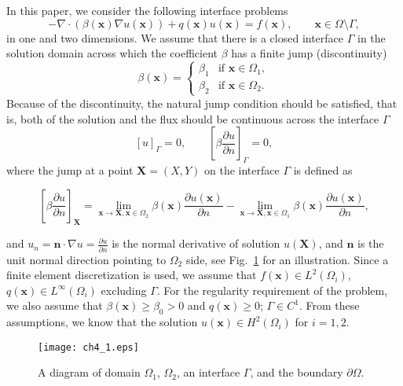 \documentclass[11pt]{article}
\numberwithin{equation}{section}
\begin{document}
In this paper, we consider  the following  interface problems
\begin{equation} \label{nabla-pde ch2}
 -  \nabla \cdot (\beta(\mathbf{x})  \nabla u(\mathbf{x})) + q(\mathbf{x}) u(\mathbf{x}) = f(\mathbf{x}), \qquad \mathbf{x}\in \Omega\setminus \Gamma,
\end{equation}
in one and two dimensions.
We assume that there is a closed interface $\Gamma$ in the solution domain across
which the coefficient $\beta$ has a finite jump (discontinuity)
\begin{equation}\label{beta ch2}
\beta(\mathbf{x})  =
\begin{cases}
 \beta_1  & \mbox{if $\mathbf{x} \in \Omega_1,$}\\
 \beta_2  & \mbox{if $\mathbf{x} \in \Omega_2.$}
 \end{cases}
\end{equation}
Because of the discontinuity,
the natural jump condition should be satisfied,
that is, both of the solution and the flux should be continuous across the interface $\Gamma$
\begin{equation}\label{flux ch2}
 [u]_{\Gamma}=0, \qquad \left[\beta \frac{\partial u}{\partial n} \right]_{\Gamma} = 0,
\end{equation}
where the jump at a point $\mathbf{X}=(X,Y)$ on the interface $\Gamma$ is defined as
\begin{small}
\begin{equation*}
\left[\beta \frac{\partial u}{\partial n} \right]_{\mathbf{X}}
  = \lim_{\mathbf{x} \rightarrow\mathbf{X}, \mathbf{x} \in \Omega_2} \beta(\mathbf{x}) \frac{\partial u(\mathbf{x})}{\partial n}  - \lim_{\mathbf{x}\rightarrow \mathbf{X}, \mathbf{x}\in \Omega_1} \beta(\mathbf{x}) \frac{\partial u(\mathbf{x})}{\partial n},
\end{equation*}
\end{small}
and  $u_n = \mathbf{n} \cdot \nabla u=\frac{\partial u}{\partial n}$ is the normal derivative of solution $u(\mathbf{X})$,
and $\mathbf{n}$ is the unit normal direction pointing to $\Omega_2$ side,
see Fig.~\ref{fig:domain ch2} for an illustration.
Since a finite element discretization is used,
we assume that $f(\mathbf{x})\in L^2(\Omega_i)$,  $q(\mathbf{x})\in L^{\infty}(\Omega_i)$ excluding $\Gamma$.
For the regularity requirement of the problem,
we also assume that $\beta(\mathbf{x})\ge \beta_0 >0$ and $q(\mathbf{x})\ge 0$; $\Gamma\in C^1$.
From these assumptions,
we know that the solution $u(\mathbf{x})\in H^2(\Omega_i)$ for $i=1,2$.
\begin{figure}[!b]
 \centering
  \texttt{[image: ch4\_1.eps]}
  \caption{A diagram of domain $\Omega_1$, $\Omega_2$, an interface $\Gamma$, and the boundary $\partial\Omega$. }\label{fig:domain ch2}
\end{figure}
\end{document}
